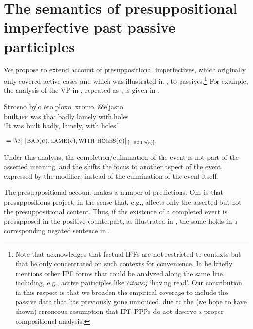 \documentclass[output=paper,modfonts,newtxmath,hidelinks
\ChapterDOI{10.5281/zenodo.2545513}
]{langscibook}
\begin{document}
\section{The semantics of presuppositional imperfective past passive participles}
\label{analysis}

We propose to extend  account of presuppositional imperfectives, which originally only covered active cases and which was illustrated in , to passives.\footnote{Note that \citet{gronndiss} acknowledges that factual IPFs are not restricted to  contexts but that he only concentrated on such contexts for convenience. In \citet{gronn15} he briefly mentions other IPF forms that could be analyzed along the same line, including, e.g.,  active participles like \textit{čitavšij} `having read'. Our contribution in this respect is that we broaden the empirical coverage to include the passive data that has previously gone unnoticed, due to the (we hope to have shown) erroneous assumption that IPF PPPs do not deserve a proper compositional analysis.} For example, the analysis of the VP in , repeated as , is given in .

\ea\gll	Stroeno bylo \.{e}to ploxo, xromo, ščeljasto.\\
	built.\textsc{ipf} was that badly lamely with.holes\\
    \glt	`It was built badly, lamely, with holes.'\label{ploxo}
    \z

\ea {}${}=\lambda e[ \hspace{0.3em}|\hspace{0.1em} \textsc{bad}(e), \textsc{lame}(e), \textsc{with holes}(e)]_{\hspace{2pt}[ \hspace{0.3em} |\hspace{0.1em}\textsc{build}(e)]}$\label{ploxoanalysis}
\z

\noindent Under this analysis, the completion/culmination of the event is not part of the asserted meaning, and the  shifts the focus to another aspect of the event, expressed by the  modifier, instead of the culmination of the event itself. 

The presuppositional account makes a number of predictions. One is that presuppositions project, in the sense that, e.g.,  affects only the asserted but not the presuppositional content. Thus, if the existence of a completed event is presupposed in the positive counterpart, as illustrated in , the same holds in a corresponding negated sentence in .
\end{document}
